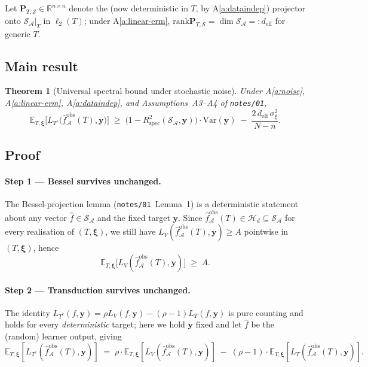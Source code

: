 \documentclass[11pt,a4paper]{article}
\theoremstyle{plain}
\newtheorem{theorem}{Theorem}
\theoremstyle{definition}
\theoremstyle{remark}
\newcommand{\by}{\mathbf{y}}
\newcommand{\bxi}{\boldsymbol{\xi}}
\newcommand{\bP}{\mathbf{P}}
\newcommand{\E}{\mathbb{E}}
\newcommand{\R}{\mathbb{R}}
\newcommand{\Var}{\mathrm{Var}}
\newcommand{\Rspec}{R^2_{\mathrm{spec}}}
\newcommand{\Scal}{\mathcal{S}}
\newcommand{\Acal}{\mathcal{A}}
\newcommand{\Hcal}{\mathcal{H}}
\newcommand{\rank}{\mathrm{rank}}
\begin{document}
Let $\bP_{T,\Scal} \in \R^{n \times n}$ denote the (now deterministic
in $T$, by A\ref{a:dataindep}) projector onto $\Scal_\Acal|_T$ in
$\ell_2(T)$; under A\ref{a:linear-erm}, $\rank \bP_{T,\Scal} =
\dim \Scal_\Acal =: d_{\mathrm{eff}}$ for generic $T$.

\subsection{Main result}

\begin{theorem}[Universal spectral bound under stochastic noise]
\label{thm:axis-1}
Under A\ref{a:noise}, A\ref{a:linear-erm}, A\ref{a:dataindep}, and
Assumptions~A3--A4 of \texttt{notes/01},
\begin{equation}
    \E_{T,\bxi}\!\Big[L_{T^c}\!\big(\hat f_\Acal^{\mathrm{obs}}(T), \by\big)\Big]
    \;\geq\;
    \big(1 - \Rspec(\Scal_\Acal, \by)\big) \cdot \Var(\by)
    \;-\; \frac{2\, d_{\mathrm{eff}}\, \sigma_\xi^2}{N - n}.
    \label{eq:axis-1-main}
\end{equation}
\end{theorem}

\subsection{Proof}

\paragraph{Step 1 --- Bessel survives unchanged.}
The Bessel-projection lemma (\texttt{notes/01}~Lemma~1) is a
deterministic statement about any vector $\hat f \in \Scal_\Acal$ and
the fixed target $\by$. Since $\hat f_\Acal^{\mathrm{obs}}(T) \in
\Hcal_d \subseteq \Scal_\Acal$ for every realisation of
$(T, \bxi)$, we still have
$L_V(\hat f_\Acal^{\mathrm{obs}}(T), \by) \ge A$ pointwise in
$(T, \bxi)$, hence
\begin{equation}
    \E_{T,\bxi}\!\big[L_V(\hat f_\Acal^{\mathrm{obs}}(T), \by)\big] \;\ge\; A.
    \label{eq:axis-1-step1}
\end{equation}

\paragraph{Step 2 --- Transduction survives unchanged.}
The identity
$L_{T^c}(f, \by) = \rho L_V(f, \by) - (\rho-1) L_T(f, \by)$ is pure
counting and holds for every \emph{deterministic} target; here we
hold $\by$ fixed and let $\hat f$ be the (random) learner output,
giving
\begin{equation}
    \E_{T,\bxi}[L_{T^c}(\hat f^{\mathrm{obs}}_\Acal(T), \by)]
    \;=\; \rho \cdot \E_{T,\bxi}[L_V(\hat f^{\mathrm{obs}}_\Acal(T), \by)]
        \;-\; (\rho - 1) \cdot \E_{T,\bxi}[L_T(\hat f^{\mathrm{obs}}_\Acal(T), \by)].
    \label{eq:axis-1-step2}
\end{equation}
\end{document}
